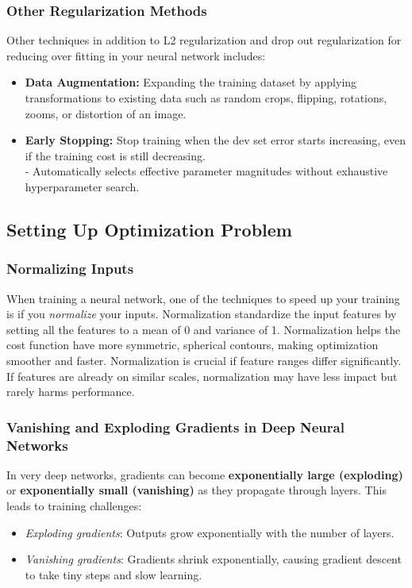 \documentclass[letterpaper,12pt,notitlepage,twoside]{report}
\begin{document}
\subsubsection{Other Regularization Methods}
Other techniques in addition to L2 regularization and drop out regularization for reducing over fitting in your neural network includes:
\begin{itemize}[nosep]
\item \textbf{Data Augmentation:} Expanding the training dataset by applying transformations to existing data such as random crops, flipping, rotations, zooms, or distortion of an image.
\item \textbf{Early Stopping:} Stop training when the dev set error starts increasing, even if the training cost is still decreasing. \\
	- Automatically selects effective parameter magnitudes without exhaustive hyperparameter search.
\end{itemize}

\subsection{Setting Up Optimization Problem}
\subsubsection{Normalizing Inputs}
When training a neural network, one of the techniques to speed up your training is if you \emph{normalize} your inputs. Normalization standardize the input features by setting all the features to a mean of 0 and variance of 1.  Normalization helps the cost function have more symmetric, spherical contours, making optimization smoother and faster. Normalization is crucial if feature ranges differ significantly. If features are already on similar scales, normalization may have less impact but rarely harms performance.

\subsubsection{Vanishing and Exploding Gradients in Deep Neural Networks}
In very deep networks, gradients can become \textbf{exponentially large (exploding)} or \textbf{exponentially small (vanishing)} as they propagate through layers. This leads to training challenges:
    \begin{itemize}
        \item \textit{Exploding gradients}: Outputs grow exponentially with the number of layers.
        \item \textit{Vanishing gradients}: Gradients shrink exponentially, causing gradient descent to take tiny steps and slow learning.
    \end{itemize}
\end{document}

